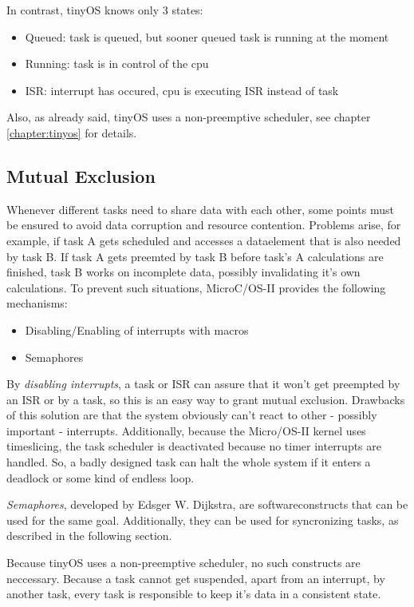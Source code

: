 In contrast, tinyOS knows only 3 states:

\begin{itemize}
 \item Queued: task is queued, but sooner queued task is running at the moment 
 \item Running: task is in control of the cpu
 \item ISR: interrupt has occured, cpu is executing ISR instead of task
\end{itemize}

Also, as already said, tinyOS uses a non-preemptive scheduler, see chapter \ref{chapter:tinyos} for details.

\subsection{Mutual Exclusion}

Whenever different tasks need to share data with each other, some points must be ensured to avoid data corruption and resource contention. Problems arise, for example, if task A gets scheduled and accesses a dataelement that is also needed by task B. If task A gets preemted by task B before task's A calculations are finished, task B works on incomplete data, possibly invalidating it's own calculations. To prevent such situations, MicroC/OS-II provides the following mechanisms:

\begin{itemize}
 \item Disabling/Enabling of interrupts with macros 
 \item Semaphores
\end{itemize}

By \textit{disabling interrupts}, a task or ISR can assure that it won't get preempted by an ISR or by a task, so this is an easy way to grant mutual exclusion. Drawbacks of this solution are that the system obviously can't react to other - possibly important - interrupts. Additionally, because the Micro/OS-II kernel uses timeslicing, the task scheduler is deactivated because no timer interrupts are handled. So, a badly designed task can halt the whole system if it enters a deadlock or some kind of endless loop.

\textit{Semaphores}, developed by Edsger W. Dijkstra, are softwareconstructs that can be used for the same goal. Additionally, they can be used for syncronizing tasks, as described in the following section.

Because tinyOS uses a non-preemptive scheduler, no such constructs are neccessary. Because a task cannot get suspended, apart from an interrupt, by another task, every task is responsible to keep it's data in a consistent state.

